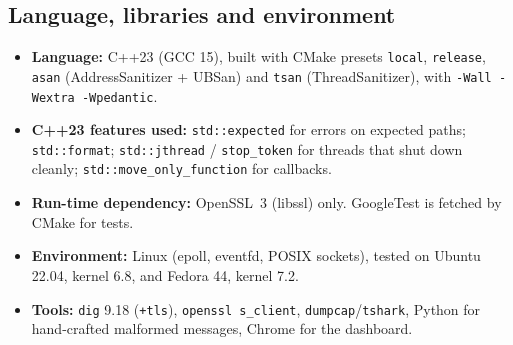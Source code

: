 \documentclass[11pt,a4paper]{article}
\newcommand{\code}[1]{\texttt{#1}}
\begin{document}
\subsection{Language, libraries and environment}
\begin{itemize}
  \item \textbf{Language:} C++23 (GCC 15), built with CMake presets \code{local}, \code{release}, \code{asan}
  (AddressSanitizer + UBSan) and \code{tsan} (ThreadSanitizer), with \code{-Wall -Wextra -Wpedantic}.
  \item \textbf{C++23 features used:} \code{std::expected} for errors on expected paths;
  \code{std::format}; \code{std::jthread} / \code{stop\_token} for threads that shut down cleanly;
  \code{std::move\_only\_function} for callbacks.
  \item \textbf{Run-time dependency:} OpenSSL~3 (libssl) only. GoogleTest is fetched by CMake for tests.
  \item \textbf{Environment:} Linux (epoll, eventfd, POSIX sockets), tested on Ubuntu 22.04, kernel 6.8, and Fedora 44, kernel 7.2.
  \item \textbf{Tools:} \code{dig} 9.18 (\code{+tls}), \code{openssl s\_client}, \code{dumpcap}/\code{tshark},
  Python for hand-crafted malformed messages, Chrome for the dashboard.
\end{itemize}
\end{document}
